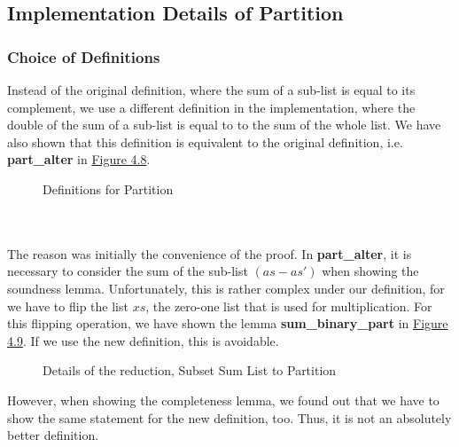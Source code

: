 \subsection{Implementation Details of Partition}
\subsubsection{Choice of Definitions}
Instead of the original definition, where the sum of a sub-list is equal to its complement, we use a different definition in the implementation,
where the double of the sum of a sub-list is equal to to the sum of the whole list. We have also shown that this definition is equivalent 
to the original definition, i.e. \textbf{part\_alter} in \hyperref[fig:4.8]{Figure 4.8}. 
\begin{figure}[!h]
    \caption{Definitions for Partition}
    \label{fig:4.8}
\end{figure}\\\\
The reason was initially the convenience of the proof. 
In \textbf{part\_alter}, it is necessary to consider the sum of the sub-list $(as - as')$ when showing the soundness lemma. 
Unfortunately, this is rather complex under our definition, for we have to flip the list $xs$, the zero-one list that is used for multiplication. For this 
flipping operation, we have shown the lemma \textbf{sum\_binary\_part} in \hyperref[fig:4.9]{Figure 4.9}. If we use the new definition, this is avoidable.
\begin{figure}[!h]
    \caption{Details of the reduction, Subset Sum List to Partition}
    \label{fig:4.9}
\end{figure}
However, when showing the completeness lemma, we found out that we have to show the same statement for the new definition, too. 
Thus, it is not an absolutely better definition. 
